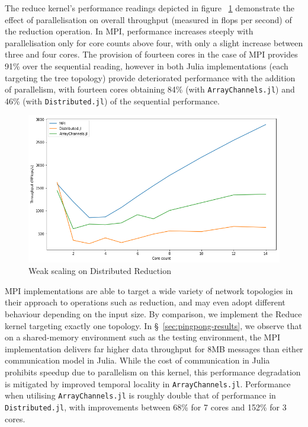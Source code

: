 The reduce kernel's performance readings depicted in figure
~\ref{fig:plot-reduce} demonstrate the effect of parallelisation on
overall throughput (measured in flops per second) of the reduction
operation. In MPI, performance increases steeply with parallelisation
only for core counts above four, with only a slight increase between
three and four cores. The provision of fourteen cores in the case of MPI
provides 91\% over the sequential reading, however in both Julia
implementations (each targeting the tree topology) provide deteriorated
performance with the addition of parallelism, with fourteen cores
obtaining 84\% (with \texttt{ArrayChannels.jl}) and 46\% (with
\texttt{Distributed.jl}) of the sequential performance.

\begin{figure}[htb]
  \includegraphics[width=\linewidth]{figs/reduce.png}
  \caption{Weak scaling on Distributed Reduction}
  \label{fig:plot-reduce}
\end{figure}

MPI implementations are able to target a wide variety of network
topologies in their approach to operations such as reduction, and may
even adopt different behaviour depending on the input size. By
comparison, we implement the Reduce kernel targeting exactly one
topology. In \S~\ref{sec:pingpong-results}, we observe that on a
shared-memory environment such as the testing environment, the MPI
implementation delivers far higher data throughput for 8MB messages than
either communication model in Julia. While the cost of communication in
Julia prohibits speedup due to parallelism on this kernel, this
performance degradation is mitigated by improved temporal locality in
\texttt{ArrayChannels.jl}. Performance when utilising \texttt{ArrayChannels.jl} is roughly double that of performance in \texttt{Distributed.jl}, with improvements between 68\% for 7 cores and 152\% for 3 cores.

